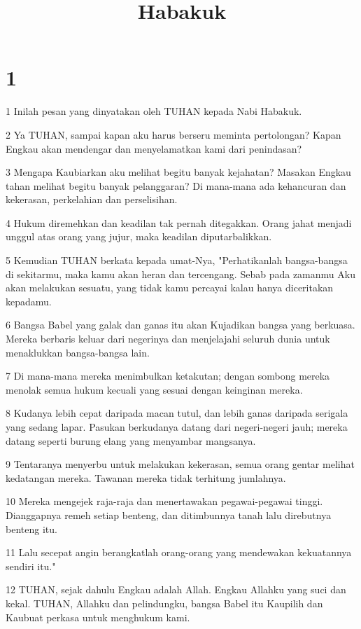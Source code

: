 

\title{Habakuk}


\chapter{1}

\par 1 Inilah pesan yang dinyatakan oleh TUHAN kepada Nabi Habakuk.
\par 2 Ya TUHAN, sampai kapan aku harus berseru meminta pertolongan? Kapan Engkau akan mendengar dan menyelamatkan kami dari penindasan?
\par 3 Mengapa Kaubiarkan aku melihat begitu banyak kejahatan? Masakan Engkau tahan melihat begitu banyak pelanggaran? Di mana-mana ada kehancuran dan kekerasan, perkelahian dan perselisihan.
\par 4 Hukum diremehkan dan keadilan tak pernah ditegakkan. Orang jahat menjadi unggul atas orang yang jujur, maka keadilan diputarbalikkan.
\par 5 Kemudian TUHAN berkata kepada umat-Nya, "Perhatikanlah bangsa-bangsa di sekitarmu, maka kamu akan heran dan tercengang. Sebab pada zamanmu Aku akan melakukan sesuatu, yang tidak kamu percayai kalau hanya diceritakan kepadamu.
\par 6 Bangsa Babel yang galak dan ganas itu akan Kujadikan bangsa yang berkuasa. Mereka berbaris keluar dari negerinya dan menjelajahi seluruh dunia untuk menaklukkan bangsa-bangsa lain.
\par 7 Di mana-mana mereka menimbulkan ketakutan; dengan sombong mereka menolak semua hukum kecuali yang sesuai dengan keinginan mereka.
\par 8 Kudanya lebih cepat daripada macan tutul, dan lebih ganas daripada serigala yang sedang lapar. Pasukan berkudanya datang dari negeri-negeri jauh; mereka datang seperti burung elang yang menyambar mangsanya.
\par 9 Tentaranya menyerbu untuk melakukan kekerasan, semua orang gentar melihat kedatangan mereka. Tawanan mereka tidak terhitung jumlahnya.
\par 10 Mereka mengejek raja-raja dan menertawakan pegawai-pegawai tinggi. Dianggapnya remeh setiap benteng, dan ditimbunnya tanah lalu direbutnya benteng itu.
\par 11 Lalu secepat angin berangkatlah orang-orang yang mendewakan kekuatannya sendiri itu."
\par 12 TUHAN, sejak dahulu Engkau adalah Allah. Engkau Allahku yang suci dan kekal. TUHAN, Allahku dan pelindungku, bangsa Babel itu Kaupilih dan Kaubuat perkasa untuk menghukum kami.

